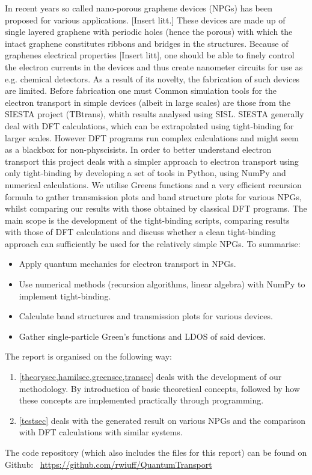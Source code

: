In recent years so called nano-porous graphene devices (NPGs) has been proposed for various applications. [Insert litt.] These devices are made up of single layered graphene with periodic holes (hence the porous) with which the intact graphene constitutes ribbons and bridges in the structures. Because of graphenes electrical properties [Insert litt], one should be able to finely control the electron currents in the devices and thus create nanometer circuits for use as e.g. chemical detectors. As a result of its novelty, the fabrication of such devices are limited. Before fabrication one must  Common simulation tools for the electron transport in simple devices (albeit in large scales) are those from the SIESTA project (TBtrans), whith results analysed using SISL\cite{zerothi_sisl}. SIESTA generally deal with DFT calculations, which can be extrapolated using tight-binding for larger scales\cite{calogero_electron_2019}. However DFT programs run complex calculations and might seem as a blackbox for non-physcisists. In order to better understand electron transport this project deals with a simpler approach to electron transport using only tight-binding by developing a set of tools in Python, using NumPy and numerical calculations. We utilise Greens functions and a very efficient recursion formula to gather transmission plots and band structure plots for various NPGs, whilst comparing our results with those obtained by classical DFT programs. The main scope is the development of the tight-binding scripts, comparing results with those of DFT calculations and discuss whether a clean tight-binding approach can sufficiently be used for the relatively simple NPGs.
To summarise:
\begin{itemize}
    \item Apply quantum mechanics for electron transport in NPGs.
    \item Use numerical methods (recursion algorithms, linear algebra) with NumPy to implement tight-binding.
    \item Calculate band structures and transmission plots for various devices.
    \item Gather single-particle Green’s functions and LDOS of said devices.
\end{itemize}
The report is organised on the following way:
\begin{enumerate}
    \item \cref{theorysec,hamilsec,greensec,transec} deals with the development of our methodology. By introduction of basic theoretical concepts, followed by how these concepts are implemented practically through programming. 
    \item \cref{testsec} deals with the generated result on various NPGs and the comparison with DFT calculations with similar systems.
\end{enumerate}
The code repository (which also includes the \latex files for this report) can be found on Github: \faGithub \ \url{https://github.com/rwiuff/QuantumTransport}
